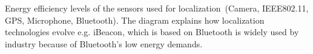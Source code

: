 Energy efficiency levels of the sensors used for localization\ (Camera, IEEE802.11, GPS, Microphone, Bluetooth). The diagram explains how localization technologies evolve e.g. iBeacon, which is based on Bluetooth is widely used by industry because of Bluetooth's low energy demands.  
